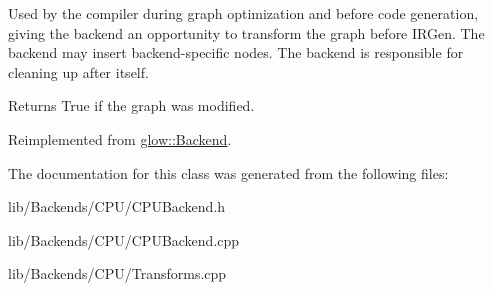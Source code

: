 Used by the compiler during graph optimization and before code generation, giving the backend an opportunity to transform the graph before I\+R\+Gen. The backend may insert backend-\/specific nodes. The backend is responsible for cleaning up after itself. \begin{DoxyReturn}{Returns}
True if the graph was modified. 
\end{DoxyReturn}


Reimplemented from \hyperlink{classglow_1_1_backend_a299652a58fc137b15c69858048980452}{glow\+::\+Backend}.



The documentation for this class was generated from the following files\+:\begin{DoxyCompactItemize}
\item 
lib/\+Backends/\+C\+P\+U/C\+P\+U\+Backend.\+h\item 
lib/\+Backends/\+C\+P\+U/C\+P\+U\+Backend.\+cpp\item 
lib/\+Backends/\+C\+P\+U/Transforms.\+cpp\end{DoxyCompactItemize}
